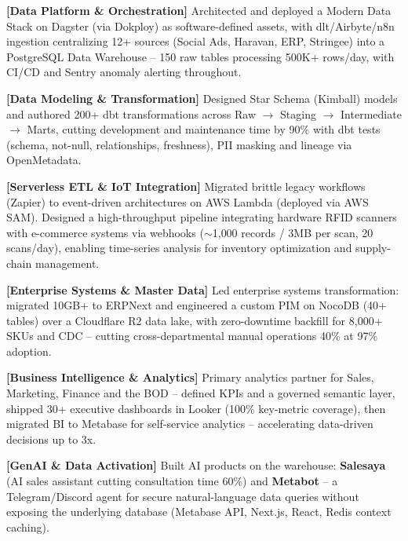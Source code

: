 
\vspace{1pt}
\begin{resume_list}
  \item \textbf{[Data Platform \& Orchestration]} Architected and deployed a Modern Data Stack on Dagster (via Dokploy) as software-defined assets, with dlt/Airbyte/n8n ingestion centralizing 12+ sources (Social Ads, Haravan, ERP, Stringee) into a PostgreSQL Data Warehouse -- 150 raw tables processing 500K+ rows/day, with CI/CD and Sentry anomaly alerting throughout.
  \item \textbf{[Data Modeling \& Transformation]} Designed Star Schema (Kimball) models and authored 200+ dbt transformations across Raw $\rightarrow$ Staging $\rightarrow$ Intermediate $\rightarrow$ Marts, cutting development and maintenance time by 90\% with dbt tests (schema, not-null, relationships, freshness), PII masking and lineage via OpenMetadata.
  \item \textbf{[Serverless ETL \& IoT Integration]} Migrated brittle legacy workflows (Zapier) to event-driven architectures on AWS Lambda (deployed via AWS SAM). Designed a high-throughput pipeline integrating hardware RFID scanners with e-commerce systems via webhooks ($\sim$1{,}000 records / 3MB per scan, 20 scans/day), enabling time-series analysis for inventory optimization and supply-chain management.
  \item \textbf{[Enterprise Systems \& Master Data]} Led enterprise systems transformation: migrated 10GB+ to ERPNext and engineered a custom PIM on NocoDB (40+ tables) over a Cloudflare R2 data lake, with zero-downtime backfill for 8,000+ SKUs and CDC -- cutting cross-departmental manual operations 40\% at 97\% adoption.
  \item \textbf{[Business Intelligence \& Analytics]} Primary analytics partner for Sales, Marketing, Finance and the BOD -- defined KPIs and a governed semantic layer, shipped 30+ executive dashboards in Looker (100\% key-metric coverage), then migrated BI to Metabase for self-service analytics -- accelerating data-driven decisions up to 3x.
  \item \textbf{[GenAI \& Data Activation]} Built AI products on the warehouse: \textbf{Salesaya} (AI sales assistant cutting consultation time 60\%) and \textbf{Metabot} -- a Telegram/Discord agent for secure natural-language data queries without exposing the underlying database (Metabase API, Next.js, React, Redis context caching).
\end{resume_list}
